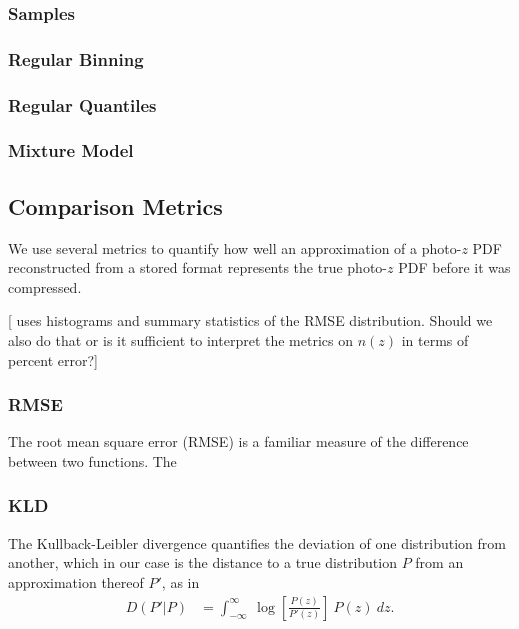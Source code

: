 \documentclass[\docopts]{\docclass}
\begin{document}
\subsubsection{Samples}
\label{sec:samples}

\subsubsection{Regular Binning}
\label{sec:bins}

\subsubsection{Regular Quantiles}
\label{sec:quantiles}

\subsubsection{Mixture Model}
\label{sec:gmm}

\subsection{Comparison Metrics}
\label{sec:metrics}


We use several metrics to quantify how well an approximation of a photo-$z$ PDF reconstructed from a stored format represents the true photo-$z$ PDF before it was compressed.

[\citet{carrasco_kind_sparse_2014} uses histograms and summary statistics of the RMSE distribution.  Should we also do that or is it sufficient to interpret the metrics on $n(z)$ in terms of percent error?]

\subsubsection{RMSE}
\label{sec:rms}

The root mean square error (RMSE) is a familiar measure of the difference between two functions.  The

\subsubsection{KLD}
\label{sec:kld}

The Kullback-Leibler divergence quantifies the deviation of one distribution from another, which in our case is the distance to a true distribution $P$ from an approximation thereof $P'$, as in
\begin{align}
  D(P' | P) &= \int_{-\infty}^{\infty}\ \log\left[\frac{P(z)}{P'(z)}\right]\ P(z)\ dz.
\end{align}
\end{document}
